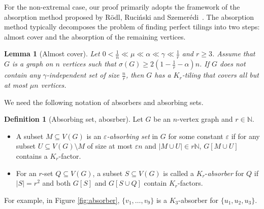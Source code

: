 \documentclass[11pt, a4paper]{article}
\newtheorem{lemma}[theorem]{Lemma}
\theoremstyle{definition}
\newtheorem{definition}[theorem]{Definition}
\newcommand{\eps}{\varepsilon}
\newcommand{\<}{\subseteq}
\begin{document}
For the non-extremal case, our proof primarily adopts the framework of the absorption method proposed by R\"odl, Ruci\'nski and Szemer\'edi~\cite{RRS2009}. %
The absorption method typically decomposes the problem of finding perfect tilings into two steps: almost cover and the absorption of the remaining vertices.%

\begin{lemma}[Almost cover]\label{almost-cover}
    Let $0<\frac{1}{n}\ll\mu\ll \alpha\ll \gamma\ll \frac{1}{r}$ and $r\ge 3$. Assume that $G$ is a graph on $n$ vertices such that $\sigma(G)\geq 2(1-\frac{1}{r}-\alpha)n$. If $G$ does not contain any $\gamma$-independent set of size $\frac{n}{r}$, then $G$ has a $K_r$-tiling that covers all but at most $\mu n$ vertices. 
\end{lemma}
We need the following notation of
 absorbers and absorbing sets.
 \begin{definition}[Absorbing set, abosrber]
      Let $G$ be an $n$-vertex graph and $r\in \mathbb{N}$. 
      \begin{itemize}
          \item A subset $M\subseteq V(G)$ is an \textit{$\eps$-absorbing set} in $G$ for some constant $\eps$ if for any subset $U\subseteq V(G)\setminus M$ of size at most $\eps n$ and $|M\cup U|\in r\mathbb{N}$, $G[M\cup U]$ contains a $K_r$-factor.
          \item For an $r$-set $Q\subseteq V(G)$, a  subset $S\subseteq V(G)$ is called a $K_r$-\textit{absorber} 
for $Q$ if $|S|=r^2$ and both $G[S]$ and $G[S\cup Q]$ contain $K_r$-factors.
      \end{itemize}
 \end{definition}

For example, in Figure \ref{fig:absorber}, $\{v_1,\ldots,v_9\}$ is a $K_3$-absorber for $\{u_1,u_2,u_3\}$. %
\end{document}
